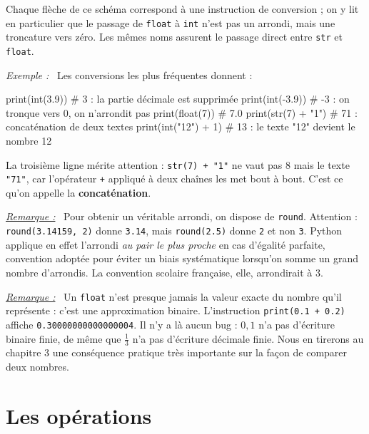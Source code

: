 \documentclass[a4paper,11pt,openany]{book}
\newcommand{\mot}[1]{\textcolor{rougecours}{\textbf{#1}}}
\newcommand{\code}[1]{\texttt{\textcolor{codebleu}{#1}}}
\newenvironment{exemple}%
 {\par\vspace{1mm}\begin{list}{}{\leftmargin=1cm \rightmargin=0.5cm}\item[]%
  \textit{Exemple :}~}%
 {\end{list}\vspace{1mm}}
\newenvironment{remarque}%
 {\par\vspace{1mm}\begin{list}{}{\leftmargin=1cm \rightmargin=0.5cm}\item[]%
  \textit{\underline{Remarque :}}~}%
 {\end{list}\vspace{1mm}}
\begin{document}
Chaque flèche de ce schéma correspond à une instruction de conversion ; on y lit en particulier que le passage de \code{float} à \code{int} n'est pas un arrondi, mais une troncature vers zéro. Les mêmes noms assurent le passage direct entre \code{str} et \code{float}.

\begin{exemple}
Les conversions les plus fréquentes donnent :
\begin{python}
print(int(3.9))     # 3   : la partie décimale est supprimée
print(int(-3.9))    # -3  : on tronque vers 0, on n'arrondit pas
print(float(7))     # 7.0
print(str(7) + "1") # 71  : concaténation de deux textes
print(int("12") + 1)  # 13 : le texte "12" devient le nombre 12
\end{python}
La troisième ligne mérite attention : \code{str(7) + "1"} ne vaut pas $8$ mais le texte \code{"71"}, car l'opérateur \code{+} appliqué à deux chaînes les met bout à bout. C'est ce qu'on appelle la \mot{concaténation}.
\end{exemple}

\begin{remarque}
Pour obtenir un véritable arrondi, on dispose de \code{round}. Attention : \code{round(3.14159, 2)} donne \code{3.14}, mais \code{round(2.5)} donne \code{2} et non \code{3}. Python applique en effet l'arrondi \emph{au pair le plus proche} en cas d'égalité parfaite, convention adoptée pour éviter un biais systématique lorsqu'on somme un grand nombre d'arrondis. La convention scolaire française, elle, arrondirait à $3$.
\end{remarque}

\begin{remarque}
Un \code{float} n'est presque jamais la valeur exacte du nombre qu'il représente : c'est une approximation binaire. L'instruction \code{print(0.1 + 0.2)} affiche \code{0.30000000000000004}. Il n'y a là aucun bug : $0{,}1$ n'a pas d'écriture binaire finie, de même que $\tfrac{1}{3}$ n'a pas d'écriture décimale finie. Nous en tirerons au chapitre 3 une conséquence pratique très importante sur la façon de comparer deux nombres.
\end{remarque}

\section{Les opérations}
\end{document}
